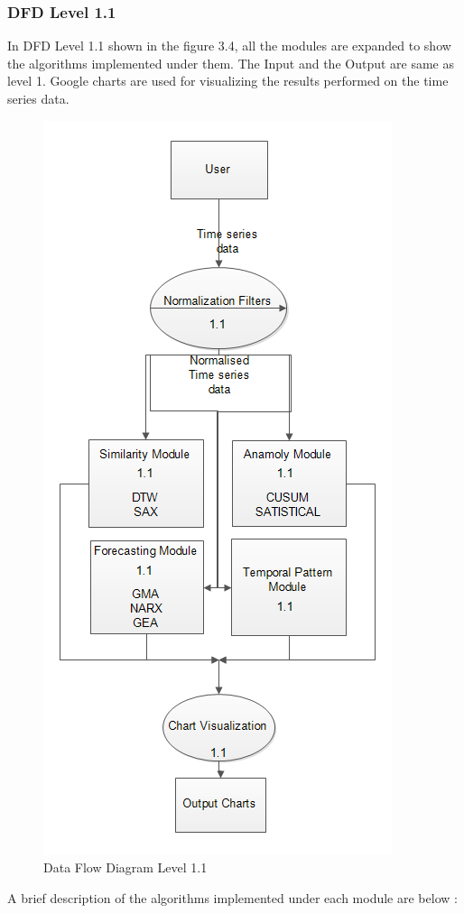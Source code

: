 \documentclass[12pt,a4paper]{report}
\begin{document}
\subsubsection{DFD Level 1.1}
In DFD Level 1.1 shown in the figure 3.4, all the modules are expanded to show the algorithms implemented under them. The Input and the Output are same as level 1. Google charts are used for visualizing the results performed on the time series data.
\begin{figure}[h!]
	\centering
		\includegraphics[scale=0.85]{screenshots/dfd_1_1.png}
		\caption{Data Flow Diagram Level 1.1}
\end{figure}
A brief description of the algorithms implemented under each module are below :
\end{document}
